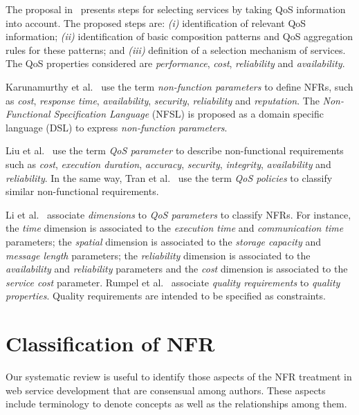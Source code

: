 \documentclass{sig-alternate}
\begin{document}
The proposal in~\cite{ThissenW06} presents steps for  selecting services 
by taking QoS information into account. The proposed steps are: 
\textit{(i)} identification of relevant QoS information; 
\textit{(ii)} identification of basic composition patterns and 
QoS aggregation rules for these patterns; and 
\textit{(iii)} definition of a selection mechanism of services. 
The QoS properties considered are \textit{performance}, \textit{cost}, \textit{reliability} and
\textit{availability}. 
  
Karunamurthy et al.~\cite{Karunamurthy2012787} use the term \textit{non-function parameters} to define NFRs, such as \textit{cost}, \textit{response time}, \textit{availability}, \textit{security}, \textit{reliability} and \textit{reputation}.  
The \textit{Non-Func\-tion\-al Specification Language} (NFSL) is proposed as a domain specific language (DSL) to express \textit{non-function parameters}.

Liu et al.~\cite{Liu20121080} use the term \textit{QoS parameter} to describe non-functional requirements such as \textit{cost}, \textit{execution duration}, \textit{accuracy}, \textit{security}, \textit{integrity}, \textit{availability} and \textit{reliability}.  
In the same way, Tran et al.~\cite{Tran2012531} use the term \textit{QoS policies} to classify similar non-functional requirements.

Li et al.~\cite{Li2013} associate \textit{dimensions} to  \textit{QoS parameters} to classify NFRs.  
For instance, the \textit{time} dimension is associated to the \textit{execution time} and \textit{communication time} parameters; the \textit{spatial} dimension is associated to the \textit{storage capacity} and \textit{message length} parameters; the \textit{reliability} dimension is associated to the \textit{availability} and \textit{reliability} parameters and the \textit{cost} dimension is associated to the \textit{service cost} parameter.
Rumpel et al.~\cite{Rumpel2012}  associate \textit{quality requirements} to  \textit{quality properties}. Quality requirements are intended to be specified as constraints. 


\section{Classification of NFR}
\label{sec:classification}

Our systematic review is useful to identify those aspects of the NFR treatment in web service development that are consensual among authors.
These aspects include terminology to denote concepts as well as the relationships among them.
\end{document}
